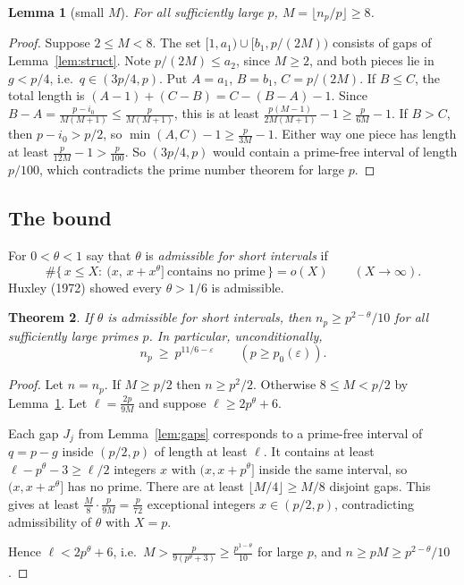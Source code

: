 \documentclass[11pt]{article}
\newtheorem{theorem}{Theorem}
\newtheorem{lemma}[theorem]{Lemma}
\theoremstyle{remark}
\begin{document}
\begin{lemma}[small $M$]\label{lem:smallM}
For all sufficiently large $p$, $M=\lfloor n_p/p\rfloor\ge 8$.
\end{lemma}
\begin{proof}
Suppose $2\le M<8$. The set $[1,a_1)\cup[b_1,p/(2M))$ consists of gaps of Lemma~\ref{lem:struct}. Note $p/(2M)\le a_2$, since $M\ge 2$, and both pieces lie in $g<p/4$, i.e.\ $q\in(3p/4,p)$. Put $A=a_1$, $B=b_1$, $C=p/(2M)$.
If $B\le C$, the total length is $(A-1)+(C-B)=C-(B-A)-1$. Since $B-A=\frac{p-i_0}{M(M+1)}\le\frac{p}{M(M+1)}$, this is at least $\frac{p(M-1)}{2M(M+1)}-1\ge\frac{p}{6M}-1$.
If $B>C$, then $p-i_0>p/2$, so $\min(A,C)-1\ge\frac{p}{3M}-1$.
Either way one piece has length at least $\frac{p}{12M}-1>\frac{p}{100}$. So $(3p/4,p)$ would contain a prime-free interval of length $p/100$, which contradicts the prime number theorem for large $p$.
\end{proof}

\subsection{The bound}

For $0<\theta<1$ say that $\theta$ is \emph{admissible for short intervals} if
\[
\#\{\,x\le X:\ (x,\,x+x^{\theta}]\ \text{contains no prime}\,\}=o(X)\qquad(X\to\infty).
\]
Huxley (1972) showed every $\theta>1/6$ is admissible.

\begin{theorem}\label{thm:lower}
If $\theta$ is admissible for short intervals, then $n_p\ge p^{2-\theta}/10$ for all sufficiently large primes $p$. In particular, unconditionally,
\[
n_p\ \ge\ p^{11/6-\varepsilon}\qquad(p\ge p_0(\varepsilon)).
\]
\end{theorem}
\begin{proof}
Let $n=n_p$. If $M\ge p/2$ then $n\ge p^2/2$. Otherwise $8\le M<p/2$ by Lemma~\ref{lem:smallM}. Let $\ell=\frac{2p}{9M}$ and suppose $\ell\ge 2p^{\theta}+6$.

Each gap $J_j$ from Lemma~\ref{lem:gaps} corresponds to a prime-free interval of $q=p-g$ inside $(p/2,p)$ of length at least $\ell$. It contains at least $\ell-p^\theta-3\ge \ell/2$ integers $x$ with $(x,x+p^\theta]$ inside the same interval, so $(x,x+x^\theta]$ has no prime. There are at least $\lfloor M/4\rfloor\ge M/8$ disjoint gaps. This gives at least $\frac M8\cdot\frac{p}{9M}=\frac{p}{72}$ exceptional integers $x\in(p/2,p)$, contradicting admissibility of $\theta$ with $X=p$.

Hence $\ell<2p^\theta+6$, i.e.\ $M>\frac{p}{9(p^\theta+3)}\ge\frac{p^{1-\theta}}{10}$ for large $p$, and $n\ge pM\ge p^{2-\theta}/10$.
\end{proof}
\end{document}
